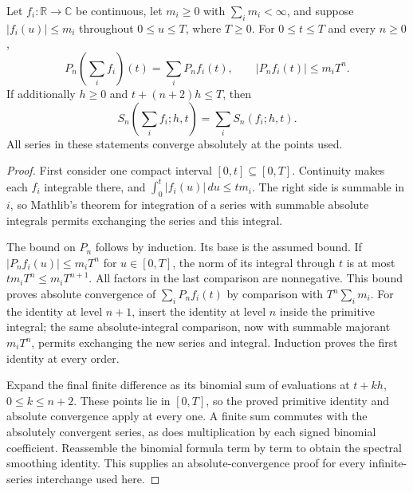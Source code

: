 \begin{lemma}
\label{kernel:smoothing-series}
\leanok
Let $f_i:\mathbb R\to\mathbb C$ be continuous, let $m_i\geq0$ with
$\sum_i m_i<\infty$, and suppose $|f_i(u)|\leq m_i$ throughout
$0\leq u\leq T$, where $T\geq0$.
For $0\leq t\leq T$ and every $n\geq0$,
\[
 P_n\!\left(\sum_i f_i\right)(t)=\sum_i P_nf_i(t),
 \qquad |P_nf_i(t)|\leq m_iT^n.
\]
If additionally $h\geq0$ and $t+(n+2)h\leq T$, then
\[
 S_n\!\left(\sum_i f_i;h,t\right)=\sum_i S_n(f_i;h,t).
\]
All series in these statements converge absolutely at the points used.
\end{lemma}
\begin{proof}
First consider one compact interval $[0,t]\subseteq[0,T]$.
Continuity makes each $f_i$ integrable there, and
$\int_0^t|f_i(u)|\,du\leq tm_i$.
The right side is summable in $i$, so Mathlib's theorem for integration
of a series with summable absolute integrals permits exchanging the
series and this integral.

The bound on $P_n$ follows by induction.  Its base is the assumed
bound.  If $|P_nf_i(u)|\leq m_iT^n$ for $u\in[0,T]$, the norm of
its integral through $t$ is at most $tm_iT^n\leq m_iT^{n+1}$.
All factors in the last comparison are nonnegative.
This bound proves absolute convergence of $\sum_iP_nf_i(t)$ by
comparison with $T^n\sum_i m_i$.
For the identity at level $n+1$, insert the identity at level $n$
inside the primitive integral; the same absolute-integral comparison,
now with summable majorant $m_iT^n$, permits exchanging the new series
and integral.  Induction proves the first identity at every order.

Expand the final finite difference as its binomial sum of evaluations
at $t+kh$, $0\leq k\leq n+2$.
These points lie in $[0,T]$, so the proved primitive identity and
absolute convergence apply at every one.
A finite sum commutes with the absolutely convergent series, as does
multiplication by each signed binomial coefficient.
Reassemble the binomial formula term by term to obtain the spectral
smoothing identity.  This supplies an absolute-convergence proof for
every infinite-series interchange used here.
\end{proof}

